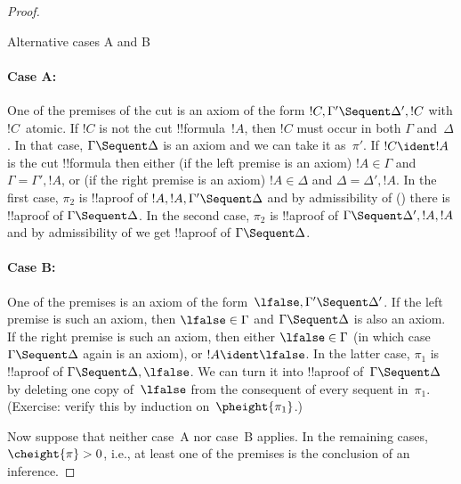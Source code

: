 \documentclass[../../../include/open-logic-section]{subfiles}
\begin{document}
\begin{proof}
\begin{center}
Alternative cases A and B
\end{center}

\paragraph{Case A:} One of the premises of the cut is an axiom of the
form $!C, \Gamma' \Sequent \Delta', !C$ with $!C$~atomic. If $!C$ is
not the cut !!{formula}~$!A$, then $!C$ must occur in both $\Gamma$
and~$\Delta$. In that case, $\Gamma \Sequent \Delta$ is an axiom and
we can take it as~$\pi'$. If $!C \ident !A$ is the cut !!{formula}
then either (if the left premise is an axiom) $!A \in \Gamma$ and
$\Gamma = \Gamma', !A$, or (if the right premise is an axiom) $!A \in
\Delta$ and $\Delta = \Delta', !A$. In the first case, $\pi_2$ is
!!a{proof} of $!A, !A, \Gamma' \Sequent \Delta$ and by admissibility
of \LeftR{\Contraction} () there is
!!a{proof} of $\Gamma \Sequent \Delta$. In the second case, $\pi_2$ is
!!a{proof} of $\Gamma \Sequent \Delta', !A, !A$ and by admissibility
of \RightR{\Contraction} we get !!a{proof} of $\Gamma \Sequent
\Delta$.

\paragraph{Case B:} One of the premises is an axiom of the
form~$\lfalse, \Gamma' \Sequent \Delta'$. If the left premise is such
an axiom, then $\lfalse \in \Gamma$ and $\Gamma \Sequent \Delta$ is
also an axiom. If the right premise is such an axiom, then either
$\lfalse \in \Gamma$ (in which case $\Gamma \Sequent \Delta$ again is
an axiom), or $!A \ident \lfalse$. In the latter case, $\pi_1$ is
!!a{proof} of $\Gamma \Sequent \Delta, \lfalse$. We can turn it into
!!a{proof} of~$\Gamma \Sequent \Delta$ by deleting one copy
of~$\lfalse$ from the consequent of every sequent in~$\pi_1$.
(Exercise: verify this by induction on~$\pheight{\pi_1}$.)

Now suppose that neither case~A nor case~B applies. In the remaining
cases, $\cheight{\pi} > 0$, i.e., at least one of the premises is the
conclusion of an inference.


\end{proof}
\end{document}
